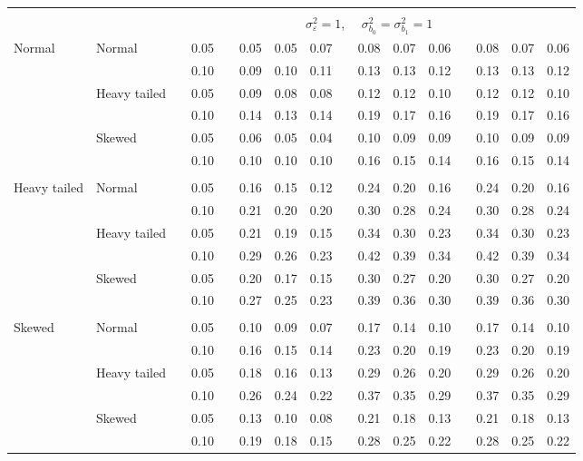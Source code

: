 \documentclass[11pt]{article} %
\begin{document}
\begin{table}[ht]
\begin{scriptsize}
\begin{center}
\begin{tabular}{ll p{.1cm} c p{.1cm} rrr p{.1cm} rrr p{.1cm} rrr}
&&&&&&&&&&&&&&&\\
& && && \multicolumn{9}{c}{$\sigma_{\varepsilon}^2 = 1$, \ \ $\sigma_{b_0}^2 = \sigma_{b_1}^2 = 1$} \\ \cline{6-16}
Normal       & Normal       && 0.05 &&  0.05 & 0.05 & 0.07 && 0.08 & 0.07 & 0.06 && 0.08 & 0.07 & 0.06 \\ 
             &              && 0.10 &&  0.09 & 0.10 & 0.11 && 0.13 & 0.13 & 0.12 && 0.13 & 0.13 & 0.12 \\ 
             & Heavy tailed && 0.05 &&  0.09 & 0.08 & 0.08 && 0.12 & 0.12 & 0.10 && 0.12 & 0.12 & 0.10 \\ 
             &              && 0.10 &&  0.14 & 0.13 & 0.14 && 0.19 & 0.17 & 0.16 && 0.19 & 0.17 & 0.16 \\ 
             & Skewed       && 0.05 &&  0.06 & 0.05 & 0.04 && 0.10 & 0.09 & 0.09 && 0.10 & 0.09 & 0.09 \\ 
             &              && 0.10 &&  0.10 & 0.10 & 0.10 && 0.16 & 0.15 & 0.14 && 0.16 & 0.15 & 0.14 \\ 
             &&&&&&&&&&&&&&&\\
Heavy tailed & Normal       && 0.05 &&  0.16 & 0.15 & 0.12 && 0.24 & 0.20 & 0.16 && 0.24 & 0.20 & 0.16 \\ 
             &              && 0.10 &&  0.21 & 0.20 & 0.20 && 0.30 & 0.28 & 0.24 && 0.30 & 0.28 & 0.24 \\ 
             & Heavy tailed && 0.05 &&  0.21 & 0.19 & 0.15 && 0.34 & 0.30 & 0.23 && 0.34 & 0.30 & 0.23 \\ 
             &              && 0.10 &&  0.29 & 0.26 & 0.23 && 0.42 & 0.39 & 0.34 && 0.42 & 0.39 & 0.34 \\ 
             & Skewed       && 0.05 &&  0.20 & 0.17 & 0.15 && 0.30 & 0.27 & 0.20 && 0.30 & 0.27 & 0.20 \\ 
             &              && 0.10 &&  0.27 & 0.25 & 0.23 && 0.39 & 0.36 & 0.30 && 0.39 & 0.36 & 0.30 \\
             &&&&&&&&&&&&&&&\\ 
Skewed       & Normal       && 0.05 &&  0.10 & 0.09 & 0.07 && 0.17 & 0.14 & 0.10 && 0.17 & 0.14 & 0.10 \\ 
             &              && 0.10 &&  0.16 & 0.15 & 0.14 && 0.23 & 0.20 & 0.19 && 0.23 & 0.20 & 0.19 \\ 
             & Heavy tailed && 0.05 &&  0.18 & 0.16 & 0.13 && 0.29 & 0.26 & 0.20 && 0.29 & 0.26 & 0.20 \\ 
             &              && 0.10 &&  0.26 & 0.24 & 0.22 && 0.37 & 0.35 & 0.29 && 0.37 & 0.35 & 0.29 \\ 
             & Skewed       && 0.05 &&  0.13 & 0.10 & 0.08 && 0.21 & 0.18 & 0.13 && 0.21 & 0.18 & 0.13 \\ 
             &              && 0.10 &&  0.19 & 0.18 & 0.15 && 0.28 & 0.25 & 0.22 && 0.28 & 0.25 & 0.22 \\ 



\end{tabular}
\end{center}
\end{scriptsize}
\end{table}
\end{document}
